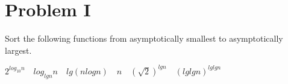 
\section{Problem I}
Sort the following functions from asymptotically smallest to asymptotically largest.

\begin{center}
	$ 2^{log_{10}{n}} \quad log_{lg{n}}{n} \quad  lg(nlog{n})  \quad  n \quad (\sqrt{2})^{lg{n}} \quad (lglgn)^{lglgn} $
\end{center}

